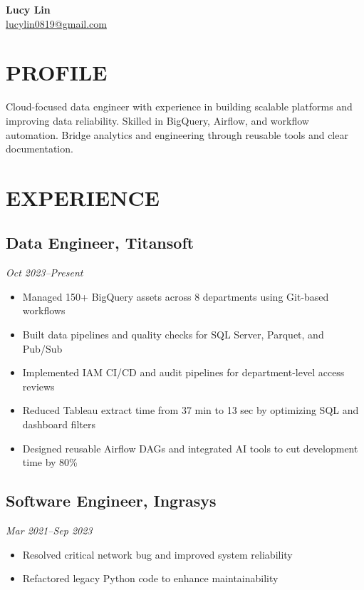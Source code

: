 \documentclass[a4paper,10pt]{article}
\begin{document}
\begin{center}
    {\Huge \textbf{Lucy Lin}} \\
    \vspace{0.5em}
    \href{mailto:lucylin0819@gmail.com}{lucylin0819@gmail.com} \\
\end{center}

\vspace{0.8em}

\section*{PROFILE}
Cloud-focused data engineer with experience in building scalable platforms and improving data reliability. Skilled in BigQuery, Airflow, and workflow automation. Bridge analytics and engineering through reusable tools and clear documentation.

\section*{EXPERIENCE}

\subsection*{Data Engineer, Titansoft}
\textit{\color{gray}Oct 2023–Present}
\begin{itemize}
    \item Managed 150+ BigQuery assets across 8 departments using Git-based workflows
    \item Built data pipelines and quality checks for SQL Server, Parquet, and Pub/Sub
    \item Implemented IAM CI/CD and audit pipelines for department-level access reviews
    \item Reduced Tableau extract time from 37 min to 13 sec by optimizing SQL and dashboard filters
    \item Designed reusable Airflow DAGs and integrated AI tools to cut development time by 80\%
\end{itemize}

\subsection*{Software Engineer, Ingrasys}
\textit{\color{gray}Mar 2021–Sep 2023}
\begin{itemize}
    \item Resolved critical network bug and improved system reliability
    \item Refactored legacy Python code to enhance maintainability
\end{itemize}
\end{document}
